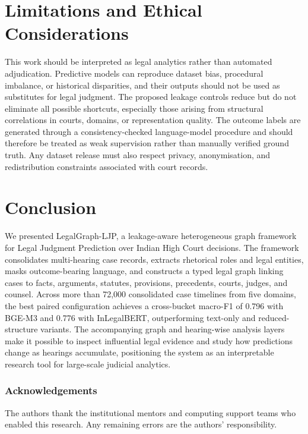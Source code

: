 \documentclass[runningheads]{llncs}
\newcommand{\method}{LegalGraph-LJP}
\begin{document}
\section{Limitations and Ethical Considerations}
\label{sec:limitations}

This work should be interpreted as legal analytics rather than automated adjudication. Predictive models can reproduce dataset bias, procedural imbalance, or historical disparities, and their outputs should not be used as substitutes for legal judgment. The proposed leakage controls reduce but do not eliminate all possible shortcuts, especially those arising from structural correlations in courts, domains, or representation quality. The outcome labels are generated through a consistency-checked language-model procedure and should therefore be treated as weak supervision rather than manually verified ground truth. Any dataset release must also respect privacy, anonymisation, and redistribution constraints associated with court records.

\section{Conclusion}
\label{sec:conclusion}

We presented \method{}, a leakage-aware heterogeneous graph framework for Legal Judgment Prediction over Indian High Court decisions. The framework consolidates multi-hearing case records, extracts rhetorical roles and legal entities, masks outcome-bearing language, and constructs a typed legal graph linking cases to facts, arguments, statutes, provisions, precedents, courts, judges, and counsel. Across more than 72,000 consolidated case timelines from five domains, the best paired configuration achieves a cross-bucket macro-F1 of 0.796 with BGE-M3 and 0.776 with InLegalBERT, outperforming text-only and reduced-structure variants. The accompanying graph and hearing-wise analysis layers make it possible to inspect influential legal evidence and study how predictions change as hearings accumulate, positioning the system as an interpretable research tool for large-scale judicial analytics.

\subsubsection*{Acknowledgements}
The authors thank the institutional mentors and computing support teams who enabled this research. Any remaining errors are the authors' responsibility.
\end{document}
